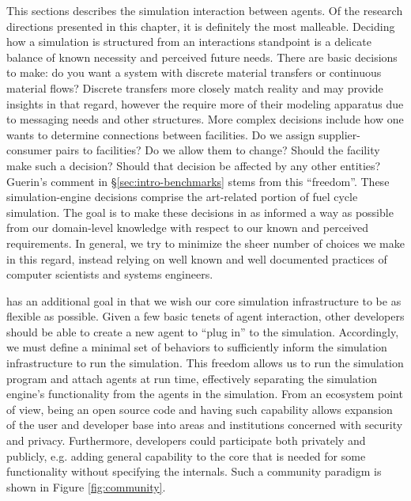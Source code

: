 This sections describes the simulation interaction between agents. Of the
research directions presented in this chapter, it is definitely the most
malleable. Deciding how a simulation is structured from an interactions
standpoint is a delicate balance of known necessity and perceived future
needs. There are basic decisions to make: do you want a system with discrete
material transfers or continuous material flows? Discrete transfers more closely
match reality and may provide insights in that regard, however the require more
of their modeling apparatus due to messaging needs and other structures. More
complex decisions include how one wants to determine connections between
facilities. Do we assign supplier-consumer pairs to facilities? Do we allow them
to change? Should the facility make such a decision? Should that decision be
affected by any other entities? Guerin's comment in \S\ref{sec:intro-benchmarks}
stems from this ``freedom''. These simulation-engine decisions comprise the
art-related portion of fuel cycle simulation. The goal is to make these
decisions in as informed a way as possible from our domain-level knowledge with
respect to our known and perceived requirements. In general, we try to minimize
the sheer number of choices we make in this regard, instead relying on well
known and well documented practices of computer scientists and systems
engineers.

\Cyclus has an additional goal in that we wish our core simulation
infrastructure to be as flexible as possible. Given a few basic tenets of agent
interaction, other developers should be able to create a new agent to ``plug
in'' to the simulation. Accordingly, we must define a minimal set of behaviors
to sufficiently inform the simulation infrastructure to run the simulation. This
freedom allows us to run the simulation program and attach agents at run time,
effectively separating the simulation engine's functionality from the agents in
the simulation. From an ecosystem point of view, being an open source code and
having such capability allows expansion of the user and developer base into
areas and institutions concerned with security and privacy. Furthermore,
developers could participate both privately and publicly, e.g. adding general
capability to the \Cyclus core that is needed for some functionality without
specifying the internals. Such a community paradigm is shown in Figure
\ref{fig:community}.


